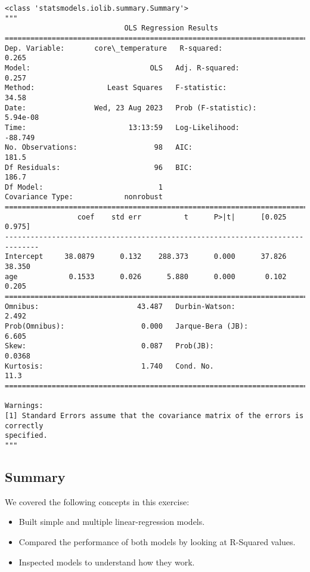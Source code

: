 \documentclass[11pt]{article}
\makeatletter
\providecommand{\tightlist}{%
      \setlength{\itemsep}{0pt}\setlength{\parskip}{0pt}}
\newcommand{\boxspacing}{\kern\kvtcb@left@rule\kern\kvtcb@boxsep}
\newcommand{\prompt}[4]{
        {\ttfamily\llap{{\color{#2}[#3]:\hspace{3pt}#4}}\vspace{-\baselineskip}}
    }
\makeatother
\begin{document}
            \begin{tcolorbox}[breakable, size=fbox, boxrule=.5pt, pad at break*=1mm, opacityfill=0]
\prompt{Out}{outcolor}{8}{\boxspacing}
\begin{Verbatim}[commandchars=\\\{\}]
<class 'statsmodels.iolib.summary.Summary'>
"""
                            OLS Regression Results
==============================================================================
Dep. Variable:       core\_temperature   R-squared:                       0.265
Model:                            OLS   Adj. R-squared:                  0.257
Method:                 Least Squares   F-statistic:                     34.58
Date:                Wed, 23 Aug 2023   Prob (F-statistic):           5.94e-08
Time:                        13:13:59   Log-Likelihood:                -88.749
No. Observations:                  98   AIC:                             181.5
Df Residuals:                      96   BIC:                             186.7
Df Model:                           1
Covariance Type:            nonrobust
==============================================================================
                 coef    std err          t      P>|t|      [0.025      0.975]
------------------------------------------------------------------------------
Intercept     38.0879      0.132    288.373      0.000      37.826      38.350
age            0.1533      0.026      5.880      0.000       0.102       0.205
==============================================================================
Omnibus:                       43.487   Durbin-Watson:                   2.492
Prob(Omnibus):                  0.000   Jarque-Bera (JB):                6.605
Skew:                           0.087   Prob(JB):                       0.0368
Kurtosis:                       1.740   Cond. No.                         11.3
==============================================================================

Warnings:
[1] Standard Errors assume that the covariance matrix of the errors is correctly
specified.
"""
\end{Verbatim}
\end{tcolorbox}
        
    \hypertarget{summary}{%
\subsection{Summary}\label{summary}}

We covered the following concepts in this exercise:

\begin{itemize}
\tightlist
\item
  Built simple and multiple linear-regression models.
\item
  Compared the performance of both models by looking at R-Squared
  values.
\item
  Inspected models to understand how they work.
\end{itemize}


    
    
    
\end{document}
